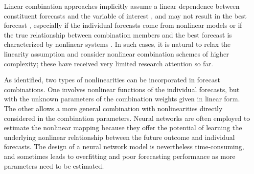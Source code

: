 \documentclass[11pt]{article}
\begin{document}
Linear combination approaches implicitly assume a linear dependence between constituent forecasts and the variable of interest \citep{Donaldson1996-um,Freitas2006-fn}, and may not result in the best forecast \citep{Ming_Shi1999-vs}, especially if the individual forecasts come from nonlinear models or if the true relationship between combination members and the best forecast is characterized by nonlinear systems \citep{Babikir2016-xz}. In such cases, it is natural to relax the linearity assumption and consider nonlinear combination schemes of higher complexity; these have received very limited research attention so far.

As \citet{Timmermann2006-en} identified, two types of nonlinearities can be incorporated in forecast combinations. One involves nonlinear functions of the individual forecasts, but with the unknown parameters of the combination weights given in linear form. The other allows a more general combination with nonlinearities directly considered in the combination parameters. Neural networks are often employed to estimate the nonlinear mapping because they offer the potential of learning the underlying nonlinear relationship between the future outcome and individual forecasts. The design of a neural network model is nevertheless time-consuming, and sometimes leads to overfitting and poor forecasting performance as more parameters need to be estimated.
\end{document}
